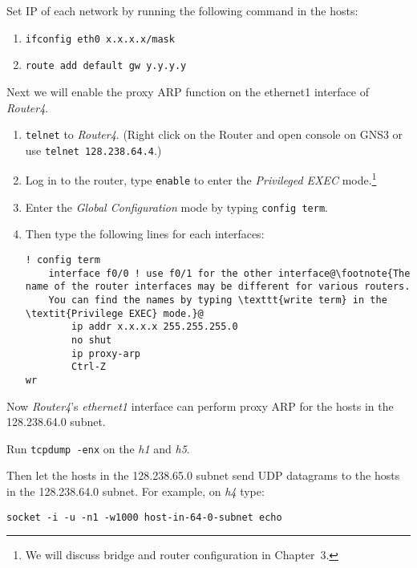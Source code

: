 \documentclass{../UTNetLab}
\begin{document}
    Set IP of each network by running the following command in the hosts:
    \begin{enumerate}
        \item \lstinline[emph={x,eth0},morekeywords={[3]masks}]{ifconfig eth0 x.x.x.x/mask}
        \item \lstinline[emph={y},morekeywords={[3]add,default,gw}]{route add default gw y.y.y.y}
    \end{enumerate}
    Next we will enable the proxy ARP function on the ethernet1 interface of \textit{Router4}.
    \begin{enumerate}
        \item \lstinline{telnet} to \textit{Router4}.
                (Right click on the Router and open console on GNS3 or use \lstinline{telnet 128.238.64.4}.)
        \item Log in to the router, type \lstinline[language={cisco}]{enable} to enter the \textit{Privileged EXEC} mode.\footnote{We will discuss bridge and router configuration in Chapter~3.}
        \item Enter the \textit{Global Configuration} mode by typing \lstinline[language={cisco}]{config term}.
        \item Then type the following lines for each interfaces:
        \begin{lstlisting}[language={cisco}, escapechar={@}, emph={x}]
! config term
    interface f0/0 ! use f0/1 for the other interface@\footnote{The name of the router interfaces may be different for various routers.
    You can find the names by typing \texttt{write term} in the \textit{Privilege EXEC} mode.}@
        ip addr x.x.x.x 255.255.255.0
        no shut
        ip proxy-arp
        Ctrl-Z
wr
        \end{lstlisting}
    \end{enumerate}
    
    Now \textit{Router4}’s \textit{ethernet1} interface can perform proxy ARP for the hosts in the 128.238.64.0 subnet.

    Run \lstinline{tcpdump -enx} on the \textit{h1} and \textit{h5}.

    Then let the hosts in the 128.238.65.0 subnet send UDP datagrams to the hosts in the 128.238.64.0 subnet.
    For example, on \textit{h4} type:
    \begin{lstlisting}[emph={host-in-64-0-subnet},morekeywords={[3]echo}]
socket -i -u -n1 -w1000 host-in-64-0-subnet echo
    \end{lstlisting}
\end{document}
